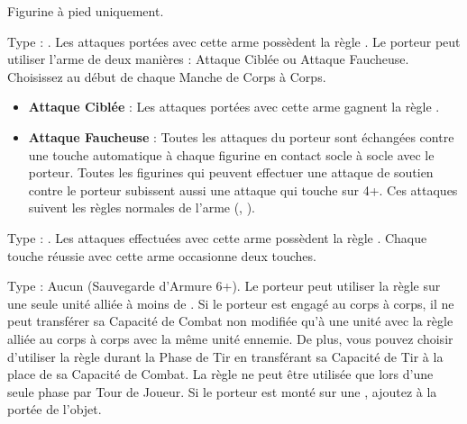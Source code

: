 \closearmynewsection








\startarmymagicalitems

\armymagicalweapons

\startpricelist

Figurine à pied uniquement.

 Type : \halberd{}. Les attaques portées avec cette arme possèdent la règle . Le porteur peut utiliser l'arme de deux manières : Attaque Ciblée ou Attaque Faucheuse. Choisissez au début de chaque Manche de Corps à Corps.
 \begin{itemize}[label={-}]
\item \textbf{Attaque Ciblée} : Les attaques portées avec cette arme gagnent la règle .
\item \textbf{Attaque Faucheuse} : Toutes les attaques du porteur sont échangées contre une touche automatique à chaque figurine en contact socle à socle avec le porteur. Toutes les figurines qui peuvent effectuer une attaque de soutien contre le porteur subissent aussi une attaque qui touche sur 4+. Ces attaques suivent les règles normales de l'arme (\halberd{}, ).
\end{itemize}

 Type : \hw{}. Les attaques effectuées avec cette arme possèdent la règle . Chaque touche réussie avec cette arme occasionne deux touches.

\endpricelist

\armymagicalarmour

\startpricelist

 Type : Aucun (Sauvegarde d'Armure 6+). Le porteur peut utiliser la règle \undyingwill{} sur une seule unité alliée à moins de . Si le porteur est engagé au corps à corps, il ne peut transférer sa Capacité de Combat non modifiée qu'à une unité avec la règle \undead{} alliée au corps à corps avec la même unité ennemie. De plus, vous pouvez choisir d'utiliser la règle \undyingwill{} durant la Phase de Tir en transférant sa Capacité de Tir à la place de sa Capacité de Combat. La règle \undyingwill{} ne peut être utilisée que lors d'une seule phase par Tour de Joueur. Si le porteur est monté sur une \largetarget{}, ajoutez  à la portée de l'objet.

